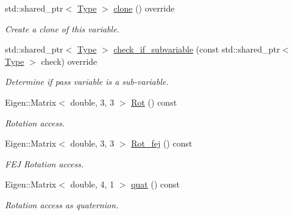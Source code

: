 \begin{DoxyCompactItemize}
\mbox{\label{classov__type_1_1PoseJPL_a0c4347fb6a988470ed5236421987d92a}} 
std\+::shared\+\_\+ptr$<$ \hyperlink{classov__type_1_1Type}{Type} $>$ \hyperlink{classov__type_1_1PoseJPL_a0c4347fb6a988470ed5236421987d92a}{clone} () override
\begin{DoxyCompactList}\small\item\em Create a clone of this variable. \end{DoxyCompactList}\item 
std\+::shared\+\_\+ptr$<$ \hyperlink{classov__type_1_1Type}{Type} $>$ \hyperlink{classov__type_1_1PoseJPL_aa2138dce0eef761ebbeacc0136da34cc}{check\+\_\+if\+\_\+subvariable} (const std\+::shared\+\_\+ptr$<$ \hyperlink{classov__type_1_1Type}{Type} $>$ check) override
\begin{DoxyCompactList}\small\item\em Determine if pass variable is a sub-\/variable. \end{DoxyCompactList}\item 
\mbox{\label{classov__type_1_1PoseJPL_aa48c6c3747ec401d1873ef94e3ad7ee2}} 
Eigen\+::\+Matrix$<$ double, 3, 3 $>$ \hyperlink{classov__type_1_1PoseJPL_aa48c6c3747ec401d1873ef94e3ad7ee2}{Rot} () const
\begin{DoxyCompactList}\small\item\em Rotation access. \end{DoxyCompactList}\item 
\mbox{\label{classov__type_1_1PoseJPL_a9e9e9bf657e838f5b1e48e8eecfd1781}} 
Eigen\+::\+Matrix$<$ double, 3, 3 $>$ \hyperlink{classov__type_1_1PoseJPL_a9e9e9bf657e838f5b1e48e8eecfd1781}{Rot\+\_\+fej} () const
\begin{DoxyCompactList}\small\item\em F\+EJ Rotation access. \end{DoxyCompactList}\item 
\mbox{\label{classov__type_1_1PoseJPL_a533fcdd266d777a1e5c419361d7e7b35}} 
Eigen\+::\+Matrix$<$ double, 4, 1 $>$ \hyperlink{classov__type_1_1PoseJPL_a533fcdd266d777a1e5c419361d7e7b35}{quat} () const
\begin{DoxyCompactList}\small\item\em Rotation access as quaternion. \end{DoxyCompactList}\item 

\end{DoxyCompactItemize}
